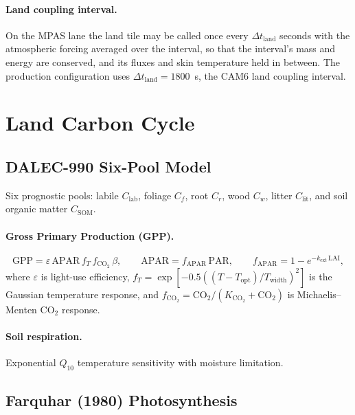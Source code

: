 \documentclass[11pt,twoside]{report}
\begin{document}
\paragraph{Land coupling interval.}
On the MPAS lane the land tile may be called once every
$\Delta t_{\mathrm{land}}$ seconds with the atmospheric forcing averaged over
the interval, so that the interval's mass and energy are conserved, and its
fluxes and skin temperature held in between.  The production configuration
uses $\Delta t_{\mathrm{land}}=1800$~s, the CAM6 land coupling interval.


\section{Land Carbon Cycle}
\label{sec:carbon}

\subsection{DALEC-990 Six-Pool Model}

Six prognostic pools: labile $C_{\mathrm{lab}}$, foliage $C_f$,
root $C_r$, wood $C_w$, litter $C_{\mathrm{lit}}$, and
soil organic matter $C_{\mathrm{SOM}}$.

\paragraph{Gross Primary Production (GPP).}
\begin{equation}
  \mathrm{GPP} = \varepsilon\,\mathrm{APAR}\,f_T\,f_{\mathrm{CO}_2}\,\beta,
  \qquad \mathrm{APAR} = f_{\mathrm{APAR}}\,\mathrm{PAR},
  \qquad f_{\mathrm{APAR}} = 1-e^{-k_{\mathrm{ext}}\,\mathrm{LAI}},
\end{equation}
where $\varepsilon$ is light-use efficiency, $f_T=\exp[-0.5((T-T_{\mathrm{opt}})/T_{\mathrm{width}})^2]$
is the Gaussian temperature response, and
$f_{\mathrm{CO}_2}=\mathrm{CO}_2/(K_{\mathrm{CO}_2}+\mathrm{CO}_2)$
is Michaelis--Menten CO$_2$ response.

\paragraph{Soil respiration.}
Exponential $Q_{10}$ temperature sensitivity with moisture limitation.

\subsection{Farquhar (1980) Photosynthesis}
\end{document}
